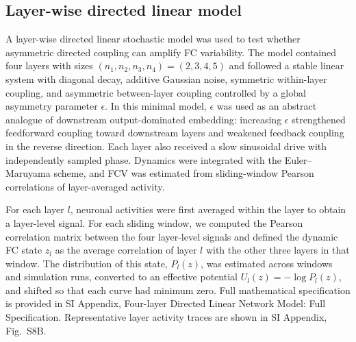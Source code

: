 \documentclass[9pt,twocolumn,twoside]{pnas-new}
\begin{document}
{%

\subsection*{Layer-wise directed linear model}

A layer-wise directed linear stochastic model was used to test whether asymmetric directed coupling can amplify FC variability. The model contained four layers with sizes $(n_1,n_2,n_3,n_4)=(2,3,4,5)$ and followed a stable linear system with diagonal decay, additive Gaussian noise, symmetric within-layer coupling, and asymmetric between-layer coupling controlled by a global asymmetry parameter $\epsilon$. In this minimal model, $\epsilon$ was used as an abstract analogue of downstream output-dominated embedding: increasing $\epsilon$ strengthened feedforward coupling toward downstream layers and weakened feedback coupling in the reverse direction. Each layer also received a slow sinusoidal drive with independently sampled phase. Dynamics were integrated with the Euler--Maruyama scheme, and FCV was estimated from sliding-window Pearson correlations of layer-averaged activity. 


For each layer $l$, neuronal activities were first averaged within the layer to obtain a layer-level signal.
For each sliding window, we computed the Pearson correlation matrix between the four layer-level signals and defined the dynamic FC state $z_l$ as the average correlation of layer $l$ with the other three layers in that window. The distribution of this state, $P_l(z)$, was estimated across windows and simulation runs, converted to an effective potential $U_l(z)=-\log P_l(z)$, and shifted so that each curve had minimum zero.
Full mathematical specification is provided in SI Appendix, Four-layer Directed Linear Network Model: Full Specification. Representative layer activity traces are shown in SI Appendix, Fig.~S8B.


}
\end{document}
